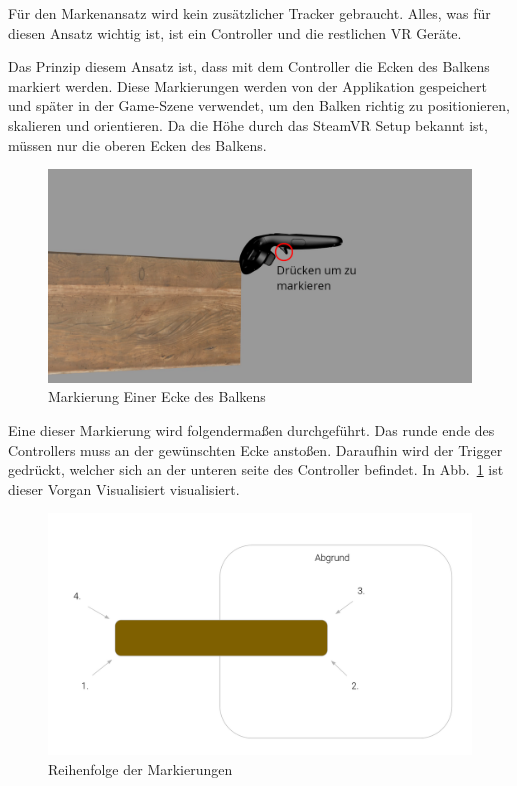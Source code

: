 Für den Markenansatz wird kein zusätzlicher Tracker gebraucht.
Alles, was für diesen Ansatz wichtig ist, ist ein Controller und die restlichen VR Geräte.

Das Prinzip diesem Ansatz ist, dass mit dem Controller die Ecken des Balkens markiert werden.
Diese Markierungen werden von der Applikation gespeichert und später in der Game-Szene verwendet, um den Balken richtig zu positionieren, skalieren und orientieren.
Da die Höhe durch das SteamVR Setup bekannt ist, müssen nur die oberen Ecken des Balkens.

\begin{figure}
    \centering
    \includegraphics[scale=0.3]{pics/beam_mark}
    \caption{Markierung Einer Ecke des Balkens}
    \label{fig:beam-mark}
\end{figure}

Eine dieser Markierung wird folgendermaßen durchgeführt.
Das runde ende des Controllers muss an der gewünschten Ecke anstoßen.
Daraufhin wird der Trigger gedrückt, welcher sich an der unteren seite des Controller befindet.
In Abb.~\ref{fig:beam-mark} ist dieser Vorgan Visualisiert visualisiert.

\begin{figure}
    \centering
    \includegraphics[scale=0.25]{pics/beam-marking-sequence}
    \caption{Reihenfolge der Markierungen}
    \label{fig:beam-marking-sequence}
\end{figure}


